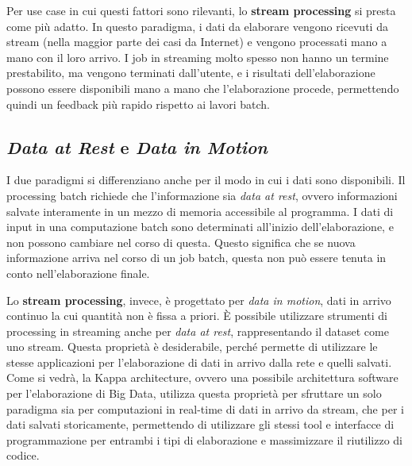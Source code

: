 \documentclass[italian,a4paper, twoside, 12pt]{report}
\begin{document}
Per use case in cui questi fattori sono rilevanti, lo \textbf{stream
processing} si presta come più adatto. In questo paradigma, i dati da
elaborare vengono ricevuti da stream (nella maggior parte dei casi da
Internet) e vengono processati mano a mano con il loro arrivo. I job in
streaming molto spesso non hanno un termine prestabilito, ma vengono
terminati dall'utente, e i risultati dell'elaborazione possono essere
disponibili mano a mano che l'elaborazione procede, permettendo quindi
un feedback più rapido rispetto ai lavori batch.

\subsection{\texorpdfstring{\emph{Data at Rest} e \emph{Data in
Motion}}{Data at Rest e Data in Motion}}\label{data-at-rest-e-data-in-motion}

I due paradigmi si differenziano anche per il modo in cui i dati sono
disponibili. Il processing batch richiede che l'informazione sia
\emph{data at rest}, ovvero informazioni salvate interamente in un mezzo
di memoria accessibile al programma. I dati di input in una computazione
batch sono determinati all'inizio dell'elaborazione, e non possono
cambiare nel corso di questa. Questo significa che se nuova informazione
arriva nel corso di un job batch, questa non può essere tenuta in conto
nell'elaborazione finale.

Lo \textbf{stream processing}, invece, è progettato per \emph{data in
motion}, dati in arrivo continuo la cui quantità non è fissa a priori. È
possibile utilizzare strumenti di processing in streaming anche per
\emph{data at rest}, rappresentando il dataset come uno stream. Questa
proprietà è desiderabile, perché permette di utilizzare le stesse
applicazioni per l'elaborazione di dati in arrivo dalla rete e quelli
salvati. Come si vedrà, la Kappa architecture, ovvero una possibile
architettura software per l'elaborazione di Big Data, utilizza questa
proprietà per sfruttare un solo paradigma sia per computazioni in
real-time di dati in arrivo da stream, che per i dati salvati
storicamente, permettendo di utilizzare gli stessi tool e interfacce di
programmazione per entrambi i tipi di elaborazione e massimizzare il
riutilizzo di codice.
\end{document}
